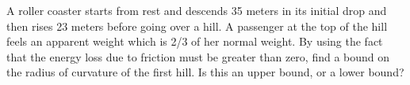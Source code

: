A roller coaster starts from rest and descends 35 meters in its
initial drop and then rises 23 meters before going over a
hill. A passenger at the top of the hill feels an apparent weight
which is 2/3 of her normal weight.
By using the fact that the energy loss due to friction must be greater than zero,
find a bound on the radius of curvature of
the first hill. Is this an
upper bound, or a lower bound?\answercheck
